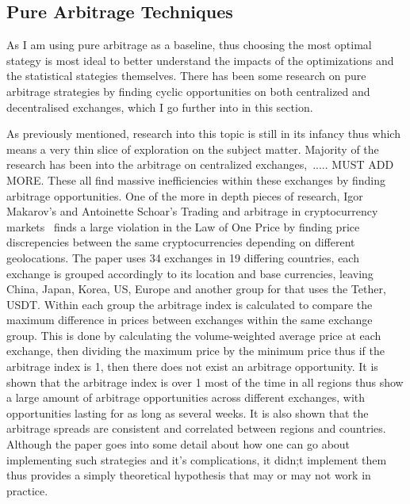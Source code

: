 \subsection{Pure Arbitrage Techniques}
As I am using pure arbitrage as a baseline, thus choosing the most optimal stategy is most ideal to better understand the impacts of the optimizations and the statistical stategies themselves. There has been some research on pure arbitrage strategies by finding cyclic opportunities on both centralized and decentralised exchanges, which I go further into in this section.


As previously mentioned, research into this topic is still in its infancy thus which means a very thin slice of exploration on the subject matter. Majority of the research has been into the arbitrage on centralized exchanges,~\cite{MakarovIgor2020Taai, crepelliere_arbitrage_2022}..... MUST ADD MORE. These all find massive inefficiencies within these exchanges by finding arbitrage opportunities. One of the more in depth pieces of research, Igor Makarov's and Antoinette Schoar's Trading and arbitrage in cryptocurrency markets~\cite{MakarovIgor2020Taai} finds a large violation in the Law of One Price by finding price discrepencies between the same cryptocurrencies depending on different geolocations. The paper uses 34 exchanges in 19 differing countries, each exchange is grouped accordingly to its location and base currencies, leaving China, Japan, Korea, US, Europe and another group for that uses the Tether, USDT. Within each group the arbitrage index is calculated to compare the maximum difference in prices between exchanges within the same exchange group. This is done by calculating the volume-weighted average price at each exchange, then dividing the maximum price by the minimum price thus if the arbitrage index is 1, then there does not exist an arbitrage opportunity. It is shown that the arbitrage index is over 1 most of the time in all regions thus show a large amount of arbitrage opportunities across different exchanges, with opportunities lasting for as long as several weeks. It is also shown that the arbitrage spreads are consistent and correlated between regions and countries. Although the paper goes into some detail about how one can go about implementing such strategies and it's complications, it didn;t implement them thus provides a simply theoretical hypothesis that may or may not work in practice. 


